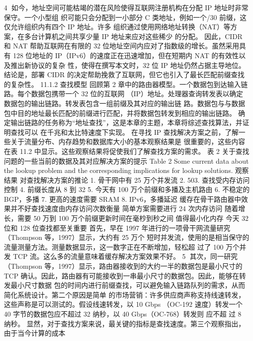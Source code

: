                                                          4
如今，地址空间可能枯竭的潜在风险使得互联网注册机构在分配 IP 地址时非常保守。一个小型组
织可能只会分配到一小部分 C 类地址，例如一个/30 前缀，这仅允许组织内有四个 IP 地址。许多
组织通过使用网络地址转换（NAT）等方案，在多台计算机之间共享少量 IP 地址来应对这些稀少
的分配。
因此，CIDR 和 NAT 帮助互联网在有限的 32 位地址空间内应对了指数级的增长。虽然采用具有
128 位地址的 IP（IPv6）的速度正在迅速增加，但在短期内 NAT 的有效性以及推出新协议的复杂
性，使得在撰写本文时，32 位 IP 地址仍然占据主导地位。
结论是，部署 CIDR 的决定帮助挽救了互联网，但它也引入了最长匹配前缀查找的复杂性。
11.1.2 查找模型
回顾第 2 章中的路由器模型。一个数据包到达输入链路。每个数据包携带一个 32 位的互联网
（IP）地址。处理器查询转发表以确定数据包的输出链路。转发表包含一组前缀及其对应的输出链
路。数据包与与数据包中目的地址最长匹配的前缀进行匹配，并将数据包转发到相应的输出链路。
确定输出链路的任务称为“地址查找”，这是本章的主题，本章将综述查找算法，并证明查找可以
在千兆和太比特速度下实现。
在寻找 IP 查找解决方案之前，了解一些关于流量分布、内存趋势和数据库大小的基本观察结果是
很重要的，这些内容在表 11.2 中显示。这些观察结果将促使我们了解查找方案的需求。
表 2 关于查找问题的一些当前的数据及其对应解决方案的提示
Table 2 Some current data about the lookup problem and the corresponding implications
for lookup solutions.
观察结果 对查找解决方案的推论
1. 骨干网中有 25 万个并发流
2. 503. 查找受内存访问控制
4. 前缀长度从 8 到 32
5. 今天有 100 万个前缀和多播及主机路由
6. 不稳定的 BGP，多播
7. 更高的速度需要 SRAM
8. IPv6，多播延迟 缓存在骨干路由器中效果并不好查找速度由内存访问次数衡量
简单方案需要进行 24 次内存访问
随着增长，需要 50 万到 100 万个前缀更新时间在毫杪到秒之间
值得最小化内存
今天 32 位和 128 位查找都至关重要
首先，早在 1997 年进行的一项骨干网流量研究（Thompson 等，1997）显示，大约有 25 万个
短时并发流，使用的是相当保守的流量测量方法。测量数据显示，这一数字正在不断增加，轻松超
过了 100 万个并发 TCP 流。这么多的流量意味着缓存解决方案效果不好。
                                                                                   5
其次，同一研究（Thompson 等，1997）显示，路由器接收到的大约一半的数据包是最小尺寸的
TCP 确认。因此，路由器有可能接收到一串最小尺寸的数据包。因此，能够在转发最小尺寸数据
包的时间内进行前缀查找，可以避免输入链路队列的需求，从而简化系统设计。第二个原因是简单
的市场营销：许多供应商声称支持线速转发，这些声称是可以测试的。假设线速转发，以 10
Gbps
（OC-192 速度）转发一个 40 字节的数据包应不超过 32 纳秒，以 40 Gbps（OC-768）转发则
应不超
过 8 纳秒。
显然，对于查找方案来说，最关键的指标是查找速度。第三个观察指出，由于当今计算的成本

